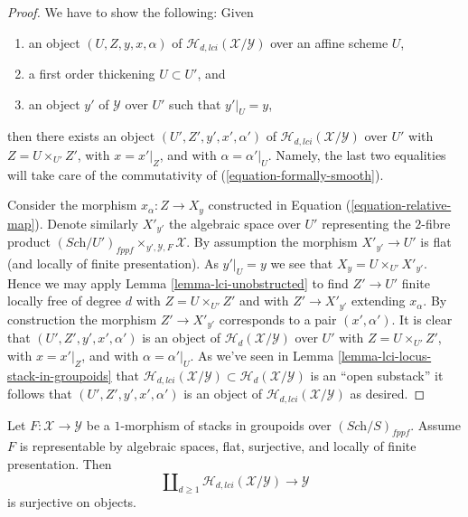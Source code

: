 \begin{proof}
We have to show the following: Given
\begin{enumerate}
\item an object $(U, Z, y, x, \alpha)$ of
$\mathcal{H}_{d, lci}(\mathcal{X}/\mathcal{Y})$ over an affine scheme $U$,
\item a first order thickening $U \subset U'$, and
\item an object $y'$ of $\mathcal{Y}$ over $U'$ such that $y'|_U = y$,
\end{enumerate}
then there exists an object $(U', Z', y', x', \alpha')$ of
$\mathcal{H}_{d, lci}(\mathcal{X}/\mathcal{Y})$ over $U'$ with
$Z = U \times_{U'} Z'$, with $x = x'|_Z$, and with
$\alpha = \alpha'|_U$. Namely, the last two equalities will take care
of the commutativity of (\ref{equation-formally-smooth}).

\medskip\noindent
Consider the morphism $x_\alpha : Z \to X_y$ constructed in
Equation (\ref{equation-relative-map}). Denote similarly $X'_{y'}$
the algebraic space over $U'$ representing the $2$-fibre product
$(\textit{Sch}/U')_{fppf} \times_{y', \mathcal{Y}, F} \mathcal{X}$.
By assumption the morphism $X'_{y'} \to U'$ is flat (and locally of finite
presentation). As $y'|_U = y$ we see that $X_y = U \times_{U'} X'_{y'}$.
Hence we may apply
Lemma \ref{lemma-lci-unobstructed}
to find $Z' \to U'$ finite locally free of degree $d$ with
$Z = U \times_{U'} Z'$ and with $Z' \to X'_{y'}$ extending $x_\alpha$.
By construction the morphism $Z' \to X'_{y'}$ corresponds to a pair
$(x', \alpha')$. It is clear that $(U', Z', y', x', \alpha')$
is an object of $\mathcal{H}_d(\mathcal{X}/\mathcal{Y})$ over $U'$
with $Z = U \times_{U'} Z'$, with $x = x'|_Z$, and with
$\alpha = \alpha'|_U$. As we've seen in
Lemma \ref{lemma-lci-locus-stack-in-groupoids}
that $\mathcal{H}_{d, lci}(\mathcal{X}/\mathcal{Y}) \subset
\mathcal{H}_d(\mathcal{X}/\mathcal{Y})$ is an ``open substack''
it follows that $(U', Z', y', x', \alpha')$ is an object of
$\mathcal{H}_{d, lci}(\mathcal{X}/\mathcal{Y})$ as desired.
\end{proof}

\begin{lemma}
\label{lemma-lci-surjective}
Let $F : \mathcal{X} \to \mathcal{Y}$ be a $1$-morphism of stacks in groupoids
over $(\textit{Sch}/S)_{fppf}$. Assume $F$ is representable by algebraic
spaces, flat, surjective, and locally of finite presentation. Then
$$
\coprod\nolimits_{d \geq 1} \mathcal{H}_{d, lci}(\mathcal{X}/\mathcal{Y})
\longrightarrow
\mathcal{Y}
$$
is surjective on objects.
\end{lemma}

